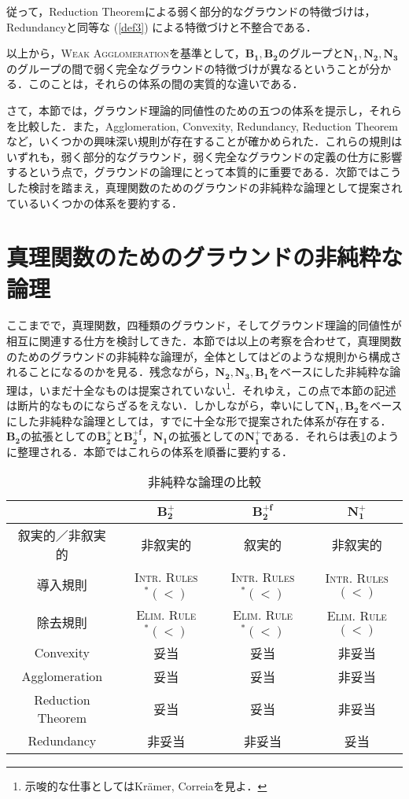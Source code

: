 \documentclass[twoside,14Q,uplatex,dvipdfmx]{jsarticle}
\theoremstyle{definition}
\begin{document}
\noindent 従って，Reduction Theoremによる弱く部分的なグラウンドの特徴づけは，Redundancyと同等な (\ref{def3}) による特徴づけと不整合である．

以上から，\textsc{Weak Agglomeration}を基準として，$\mathbf{B_{1}}, \mathbf{B_{2}}$のグループと$\mathbf{N_{1}}, \mathbf{N_{2}}, \mathbf{N_{3}}$のグループの間で弱く完全なグラウンドの特徴づけが異なるということが分かる．このことは，それらの体系の間の実質的な違いである．

さて，本節では，グラウンド理論的同値性のための五つの体系を提示し，それらを比較した．また，Agglomeration, Convexity, Redundancy, Reduction Theoremなど，いくつかの興味深い規則が存在することが確かめられた．これらの規則はいずれも，弱く部分的なグラウンド，弱く完全なグラウンドの定義の仕方に影響するという点で，グラウンドの論理にとって本質的に重要である．次節ではこうした検討を踏まえ，真理関数のためのグラウンドの非純粋な論理として提案されているいくつかの体系を要約する．
%
%
%
\section{真理関数のためのグラウンドの非純粋な論理}\label{iplg}
ここまでで，真理関数，四種類のグラウンド，そしてグラウンド理論的同値性が相互に関連する仕方を検討してきた．本節では以上の考察を合わせて，真理関数のためのグラウンドの非純粋な論理が，全体としてはどのような規則から構成されることになるのかを見る．残念ながら，$\mathbf{N_{2}, N_{3}, B_{1}}$をベースにした非純粋な論理は，いまだ十全なものは提案されていない\footnote{示唆的な仕事としてはKr\"{a}mer\cite{Kramer2018,Kramer2021}, Correia\cite{Correia2016}を見よ．}．それゆえ，この点で本節の記述は断片的なものにならざるをえない．しかしながら，幸いにして$\mathbf{N_{1}, B_{2}}$をベースにした非純粋な論理としては，すでに十全な形で提案された体系が存在する．$\mathbf{B_{2}}$の拡張としての$\mathbf{B_{2}^{+}}$と$\mathbf{B_{2}^{+f}}$，$\mathbf{N_{1}}$の拡張としての$\mathbf{N_{1}^{+}}$である．それらは表\ref{ImpureLogics}のように整理される．本節ではこれらの体系を順番に要約する．

\begin{table}[h]
\caption{非純粋な論理の比較}
\label{ImpureLogics}
\centering
	\begin{tabular}{cccc}
	\hline
	 & $\mathbf{B_{2}^{+}}$ & $\mathbf{B_{2}^{+f}}$ & $\mathbf{N_{1}^{+}}$ \\
	\hline \hline
	叙実的／非叙実的 & 非叙実的 & 叙実的 & 非叙実的 \\
	導入規則 & \textsc{Intr. Rules$^{*}(<)$} & \textsc{Intr. Rules$^{*}(<)$} & \textsc{Intr. Rules$(<)$} \\
	除去規則 & \textsc{Elim. Rule$^{*}(<)$} & \textsc{Elim. Rule$^{*}(<)$} & \textsc{Elim. Rule$(<)$} \\
	Convexity & 妥当 & 妥当 & 非妥当 \\
	Agglomeration & 妥当 & 妥当 & 非妥当 \\
	Reduction Theorem & 妥当 & 妥当 & 非妥当 \\
	Redundancy & 非妥当 & 非妥当 & 妥当 \\
	\hline
	\end{tabular}
\end{table}
\end{document}

